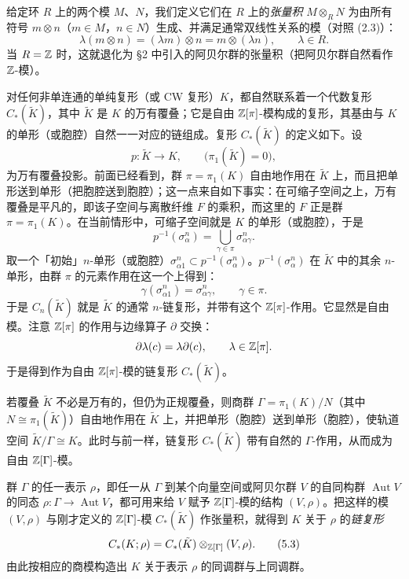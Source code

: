 给定环 $R$ 上的两个模 $M$、$N$，我们定义它们在 $R$ 上的\emph{张量积} $M\otimes_R N$ 为由所有符号 $m\otimes n$（$m\in M$，$n\in N$）生成、并满足通常双线性关系的模（对照 (2.3)）：
\begin{equation}
  \lambda(m\otimes n)=(\lambda m)\otimes n=m\otimes(\lambda n),\qquad \lambda\in R. \tag{5.2}
\end{equation}
当 $R=\mathbb{Z}$ 时，这就退化为 §2 中引入的阿贝尔群的张量积（把阿贝尔群自然看作 $\mathbb{Z}$-模）。

对任何非单连通的单纯复形（或 CW 复形）$K$，都自然联系着一个代数复形 $C_*(\tilde K)$，其中 $\tilde K$ 是 $K$ 的万有覆叠；它是自由 $\mathbb{Z}[\pi]$-模构成的复形，其基由与 $K$ 的单形（或胞腔）自然一一对应的链组成。复形 $C_*(\tilde K)$ 的定义如下。设
\[
  p\colon\tilde K\longrightarrow K,\qquad \bigl(\pi_1(\tilde K)=0\bigr),
\]
为万有覆叠投影。前面已经看到，群 $\pi=\pi_1(K)$ 自由地作用在 $\tilde K$ 上，而且把单形送到单形（把胞腔送到胞腔）；这一点来自如下事实：在可缩子空间之上，万有覆叠是平凡的，即该子空间与离散纤维 $F$ 的乘积，而这里的 $F$ 正是群 $\pi=\pi_1(K)$。在当前情形中，可缩子空间就是 $K$ 的单形（或胞腔），于是
\[
  p^{-1}(\sigma^n_\alpha)=\bigcup_{\gamma\in\pi}\sigma^n_{\alpha\gamma}.
\]
取一个「初始」$n$-单形（或胞腔）$\sigma^n_{\alpha 1}\subset p^{-1}(\sigma^n_\alpha)$。$p^{-1}(\sigma^n_\alpha)$ 在 $\tilde K$ 中的其余 $n$-单形，由群 $\pi$ 的元素作用在这一个上得到：
\[
  \gamma(\sigma^n_{\alpha 1})=\sigma^n_{\alpha\gamma},\qquad \gamma\in\pi.
\]
于是 $C_n(\tilde K)$ 就是 $\tilde K$ 的通常 $n$-链复形，并带有这个 $\mathbb{Z}[\pi]$-作用。它显然是自由模。注意 $\mathbb{Z}[\pi]$ 的作用与边缘算子 $\partial$ 交换：
\[
  \partial\lambda(c)=\lambda\partial(c),\qquad \lambda\in\mathbb{Z}[\pi].
\]
于是得到作为自由 $\mathbb{Z}[\pi]$-模的链复形 $C_*(\tilde K)$。

若覆叠 $\tilde K$ 不必是万有的，但仍为正规覆叠，则商群 $\Gamma=\pi_1(K)/N$（其中 $N\cong\pi_1(\tilde K)$）自由地作用在 $\tilde K$ 上，并把单形（胞腔）送到单形（胞腔），使轨道空间 $\tilde K/\Gamma\cong K$。此时与前一样，链复形 $C_*(\tilde K)$ 带有自然的 $\Gamma$-作用，从而成为自由 $\mathbb{Z}[\Gamma]$-模。

群 $\Gamma$ 的任一表示 $\rho$，即任一从 $\Gamma$ 到某个向量空间或阿贝尔群 $V$ 的自同构群 $\operatorname{Aut}V$ 的同态 $\rho\colon\Gamma\to\operatorname{Aut}V$，都可用来给 $V$ 赋予 $\mathbb{Z}[\Gamma]$-模的结构 $(V,\rho)$。把这样的模 $(V,\rho)$ 与刚才定义的 $\mathbb{Z}[\Gamma]$-模 $C_*(\tilde K)$ 作张量积，就得到 $K$ 关于 $\rho$ 的\emph{链复形}
\begin{equation}
  C_*(K;\rho)=C_*(\tilde K)\otimes_{\mathbb{Z}[\Gamma]}(V,\rho). \tag{5.3}
\end{equation}
由此按相应的商模构造出 $K$ 关于表示 $\rho$ 的同调群与上同调群。

